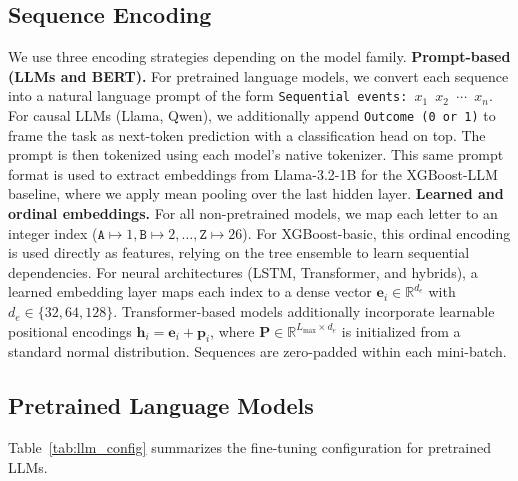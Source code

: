 \documentclass{article}
\theoremstyle{plain}
\theoremstyle{definition}
\theoremstyle{remark}
\begin{document}
\subsection{Sequence Encoding}
\label{subsec:encoding}
We use three encoding strategies depending on the model family. \textbf{Prompt-based (LLMs and BERT).} For pretrained language models, we convert each sequence into a natural language prompt of the form \texttt{Sequential events: $x_1$ $x_2$ $\cdots$ $x_n$}. For causal LLMs (Llama, Qwen), we additionally append \texttt{Outcome (0 or 1)} to frame the task as next-token prediction with a classification head on top. The prompt is then tokenized using each model's native tokenizer. This same prompt format is used to extract embeddings from Llama-3.2-1B for the XGBoost-LLM baseline, where we apply mean pooling over the last hidden layer. \textbf{Learned and ordinal embeddings.} For all non-pretrained models, we map each letter to an integer index ($\texttt{A} \mapsto 1, \texttt{B} \mapsto 2, \ldots, \texttt{Z} \mapsto 26$). For XGBoost-basic, this ordinal encoding is used directly as features, relying on the tree ensemble to learn sequential dependencies. For neural architectures (LSTM, Transformer, and hybrids), a learned embedding layer maps each index to a dense vector $\mathbf{e}_i \in \mathbb{R}^{d_e}$ with $d_e \in \{32, 64, 128\}$. Transformer-based models additionally incorporate learnable positional encodings $\mathbf{h}_i = \mathbf{e}_i + \mathbf{p}_i$, where $\mathbf{P} \in \mathbb{R}^{L_{\max} \times d_e}$ is initialized from a standard normal distribution. Sequences are zero-padded within each mini-batch.


\subsection{Pretrained Language Models}
\label{appendix:pretrained}

Table~\ref{tab:llm_config} summarizes the fine-tuning configuration for pretrained LLMs.
\end{document}
